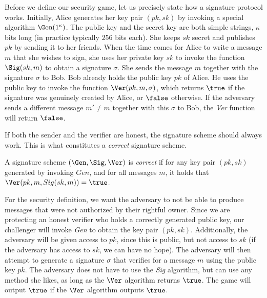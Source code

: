 Before we define our security game, let us precisely state how a signature protocol
works. Initially, Alice generates her key pair $(pk, sk)$ by invoking a special algorithm
%
$\Gen(1^\kappa)$. The public key and the secret key are both simple strings, $\kappa$
bits long (in practice typically $256$ bits each).
She keeps $sk$ secret and publishes $pk$ by
sending it to her friends. When the time comes for Alice to write a message $m$
that she wishes to sign, she uses her private key $sk$ to invoke the function
%
$\Sig(sk, m)$
to obtain a signature $\sigma$. She sends the message $m$ together
with the signature $\sigma$ to Bob. Bob already holds the public key $pk$ of Alice.
He uses the public key to invoke the function
%
$\Ver(pk, m, \sigma)$,
which returns
$\true$ if the signature was genuinely created by Alice, or $\false$ otherwise.
If the adversary sends a different message $m' \neq m$ together with this $\sigma$
to Bob, the \emph{Ver} function will return $\false$.

If both the sender and the verifier are honest, the signature scheme should always
work. This is what constitutes a \emph{correct} signature scheme.

\begin{definition}
  A signature scheme $(\Gen, \Sig, \Ver)$ is \emph{correct} if
  for any key pair $(pk, sk)$ generated by invoking $Gen$, and
  for all messages $m$, it holds that $\Ver(pk, m, Sig(sk, m)) = \true$.
\end{definition}

For the security definition, we want the adversary to not be able to produce
messages that were not authorized by their rightful owner. Since we are protecting
an honest verifier who holds a correctly generated public key, our challenger will
invoke \emph{Gen} to obtain the key pair $(pk, sk)$. Additionally, the adversary will
be given access to $pk$, since this is public, but not access to $sk$ (if the adversary
has access to $sk$, we can have no hope). The adversary will then attempt to generate
a signature $\sigma$ that verifies for a message $m$ using the public key $pk$.
The adversary does not have to use the \emph{Sig} algorithm, but can use any method
she likes, as long as the $\Ver$ algorithm returns $\true$. The game will output
$\true$ if the $\Ver$ algorithm outputs $\true$.

